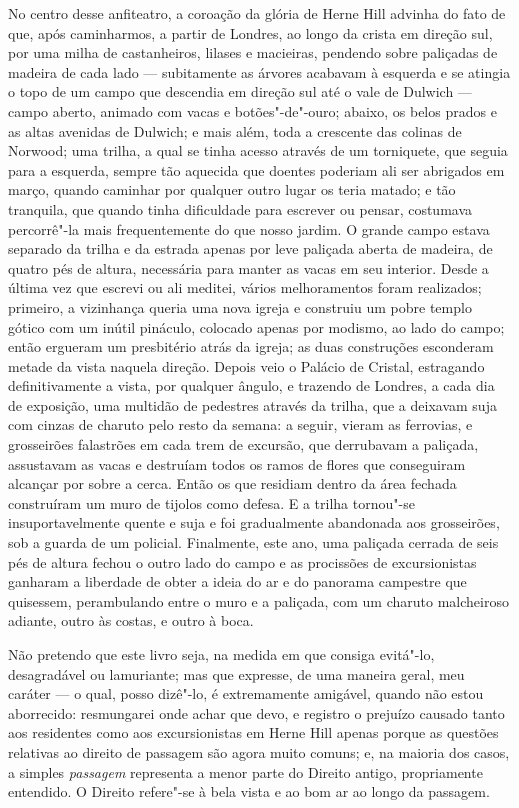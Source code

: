 No centro desse anfiteatro, a coroação da glória de Herne Hill \label{herne}
advinha do fato de que, após caminharmos, a partir de Londres, ao longo
da crista em direção sul, por uma milha de castanheiros, lilases e
macieiras, pendendo sobre paliçadas de madeira de cada lado ---
subitamente as árvores acabavam à esquerda e se atingia o topo de um
campo que descendia em direção sul até o vale de Dulwich --- campo
aberto, animado com vacas e botões"-de"-ouro; abaixo, os belos prados e as
altas avenidas de Dulwich; e mais além, toda a crescente das colinas de
Norwood; uma trilha, a qual se tinha acesso através de um torniquete,
que seguia para a esquerda, sempre tão aquecida que doentes poderiam ali
ser abrigados em março, quando caminhar por qualquer outro lugar os
teria matado; e tão tranquila, que quando tinha dificuldade para
escrever ou pensar, costumava percorrê"-la mais frequentemente do que
nosso jardim. O grande campo estava separado da trilha e da estrada
apenas por leve paliçada aberta de madeira, de quatro pés de altura,
necessária para manter as vacas em seu interior. Desde a última vez que
escrevi ou ali meditei, vários melhoramentos foram realizados; primeiro,
a vizinhança queria uma nova igreja e construiu um pobre templo gótico
com um inútil pináculo, colocado apenas por modismo, ao lado do campo;
então ergueram um presbitério atrás da igreja; as duas construções
esconderam metade da vista naquela direção. Depois veio o Palácio de
Cristal, estragando definitivamente a vista, por qualquer ângulo, e
trazendo de Londres, a cada dia de exposição, uma multidão de pedestres
através da trilha, que a deixavam suja com cinzas de charuto pelo resto
da semana: a seguir, vieram as ferrovias, e grosseirões falastrões em
cada trem de excursão, que derrubavam a paliçada, assustavam as vacas e
destruíam todos os ramos de flores que conseguiram alcançar por sobre a
cerca. Então os que residiam dentro da área fechada construíram um muro
de tijolos como defesa. E a trilha tornou"-se insuportavelmente quente e
suja e foi gradualmente abandonada aos grosseirões, sob a guarda de um
policial. Finalmente, este ano, uma paliçada cerrada de seis pés de
altura fechou o outro lado do campo e as procissões de excursionistas
ganharam a liberdade de obter a ideia do ar e do panorama campestre que
quisessem, perambulando entre o muro e a paliçada, com um charuto
malcheiroso adiante, outro às costas, e outro à boca.

Não pretendo que este livro seja, na medida em que consiga evitá"-lo,
desagradável ou lamuriante; mas que expresse, de uma maneira geral, meu
caráter --- o qual, posso dizê"-lo, é extremamente amigável, quando não
estou aborrecido: resmungarei onde achar que devo, e registro o prejuízo
causado tanto aos residentes como aos excursionistas em Herne Hill 
apenas porque as questões relativas ao direito de passagem são agora
muito comuns; e, na maioria dos casos, a simples \textit{passagem}
representa a menor parte do Direito antigo, propriamente entendido. O
Direito refere"-se à bela vista e ao bom ar ao longo da passagem.

